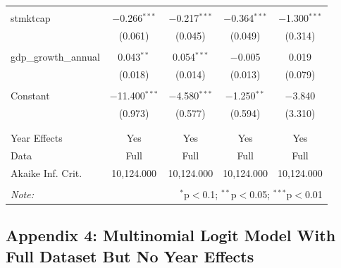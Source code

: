 \documentclass[a4paper, nobind]{templates/ociamthesis}
\begin{document}
\begin{table}[!htbp]
\begin{tabular}{@{\extracolsep{5pt}}lcccc}
  & & & & \\ 
 stmktcap & $-$0.266$^{***}$ & $-$0.217$^{***}$ & $-$0.364$^{***}$ & $-$1.300$^{***}$ \\ 
  & (0.061) & (0.045) & (0.049) & (0.314) \\ 
  & & & & \\ 
 gdp\_growth\_annual & 0.043$^{**}$ & 0.054$^{***}$ & $-$0.005 & 0.019 \\ 
  & (0.018) & (0.014) & (0.013) & (0.079) \\ 
  & & & & \\ 
 Constant & $-$11.400$^{***}$ & $-$4.580$^{***}$ & $-$1.250$^{**}$ & $-$3.840 \\ 
  & (0.973) & (0.577) & (0.594) & (3.310) \\ 
  & & & & \\ 
\hline \\[-1.8ex] 
Year Effects & Yes & Yes & Yes & Yes \\ 
Data & Full & Full & Full & Full \\ 
Akaike Inf. Crit. & 10,124.000 & 10,124.000 & 10,124.000 & 10,124.000 \\ 
\hline 
\hline \\[-1.8ex] 
\textit{Note:}  & \multicolumn{4}{r}{$^{*}$p$<$0.1; $^{**}$p$<$0.05; $^{***}$p$<$0.01} \\ 
\end{tabular} 
\end{table}

\newpage

\hypertarget{appendix-4-multinomial-logit-model-with-full-dataset-but-no-year-effects}{%
\subsection{Appendix 4: Multinomial Logit Model With Full Dataset But No Year Effects}\label{appendix-4-multinomial-logit-model-with-full-dataset-but-no-year-effects}}
\end{document}
